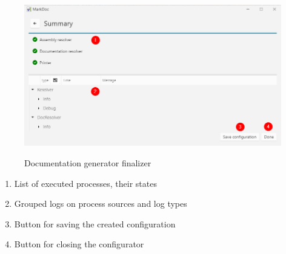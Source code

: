 \begin{figure}[H]
    \includegraphics[width=\linewidth]{img/markDocFinalizer.png}
    \label{fig:finalizerPage}
    \caption{Documentation generator finalizer}
\end{figure}

\begin{enumerate}
    \item List of executed processes, their states
    \item Grouped logs on process sources and log types
    \item Button for saving the created configuration
    \item Button for closing the configurator
\end{enumerate}